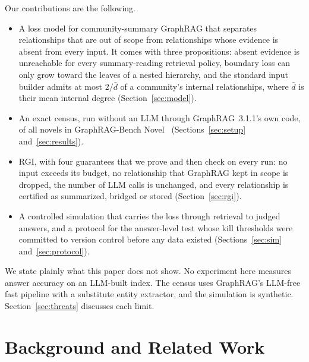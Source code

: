 \documentclass[journal]{IEEEtran}
\theoremstyle{remark}
\begin{document}
Our contributions are the following.
\begin{itemize}
\item A loss model for community-summary GraphRAG that separates relationships that are out of scope from relationships whose evidence is absent from every input. It comes with three propositions: absent evidence is unreachable for every summary-reading retrieval policy, boundary loss can only grow toward the leaves of a nested hierarchy, and the standard input builder admits at most $2/\bar d$ of a community's internal relationships, where $\bar d$ is their mean internal degree (Section~\ref{sec:model}).
\item An exact census, run without an LLM through GraphRAG~3.1.1's own code, of all \NNovels{} novels in GraphRAG-Bench Novel~\cite{xiang2026graphragbench} (Sections~\ref{sec:setup} and~\ref{sec:results}).
\item RGI, with four guarantees that we prove and then check on every run: no input exceeds its budget, no relationship that GraphRAG kept in scope is dropped, the number of LLM calls is unchanged, and every relationship is certified as summarized, bridged or stored (Section~\ref{sec:rgi}).
\item A controlled simulation that carries the loss through retrieval to judged answers, and a protocol for the answer-level test whose kill thresholds were committed to version control before any data existed (Sections~\ref{sec:sim} and~\ref{sec:protocol}).
\end{itemize}

We state plainly what this paper does not show. No experiment here measures answer accuracy on an LLM-built index. The census uses GraphRAG's LLM-free fast pipeline with a substitute entity extractor, and the simulation is synthetic. Section~\ref{sec:threats} discusses each limit.

\section{Background and Related Work}\label{sec:related}
\end{document}

